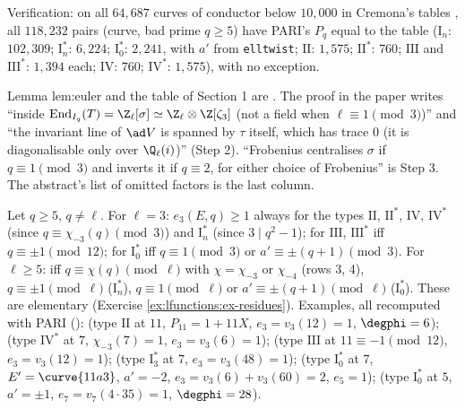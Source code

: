 Verification: on all $64{,}687$ curves of conductor below $10{,}000$ in Cremona's tables \cite{ecdata}, all $118{,}232$ pairs (curve, bad prime $q\ge5$) have PARI's $P_q$
equal to the table ($\mathrm I_n$: $102{,}309$; $\mathrm I_n^*$: $6{,}224$; $\mathrm I_0^*$: $2{,}241$, with $a'$ from \texttt{elltwist}; $\mathrm{II}$: $1{,}575$; $\mathrm{II}^*$: $760$; $\mathrm{III}$ and
$\mathrm{III}^*$: $1{,}394$ each; $\mathrm{IV}$: $760$; $\mathrm{IV}^*$: $1{,}575$), with no exception.

\begin{paperlink}
Lemma lem:euler and the table of Section 1 are . The proof in the paper writes ``inside $\operatorname{End}_{I_q}(T)=\Z_\ell[\sigma]\simeq\Z_\ell\otimes\Z[\zeta_3]$ (not a field
when $\ell\equiv1\pmod3$)'' and ``the invariant line of $\ad V$ is spanned by $\tau$ itself, which has trace $0$ (it is diagonalisable only over $\Q_\ell(i)$)'' (Step 2). ``Frobenius centralises $\sigma$ if $q\equiv1\pmod3$ and inverts it if
$q\equiv2$, for either choice of Frobenius'' is Step 3. The abstract's list of omitted factors is the last column.
\end{paperlink}

\begin{remark}\label{rem:lfunctions:euler-values}
Let $q\ge5$, $q\ne\ell$. For $\ell=3$: $e_3(E,q)\ge1$ always for the types $\mathrm{II}$, $\mathrm{II}^*$, $\mathrm{IV}$, $\mathrm{IV}^*$ (since $q\equiv\chi_{-3}(q)\pmod3$) and $\mathrm I_n^*$ (since
$3\mid q^2-1$); for $\mathrm{III}$, $\mathrm{III}^*$ iff $q\equiv\pm1\pmod{12}$; for $\mathrm I_0^*$ iff $q\equiv1\pmod3$ or $a'\equiv\pm(q+1)\pmod3$. For $\ell\ge5$: iff $q\equiv\chi(q)\pmod\ell$ with
$\chi=\chi_{-3}$ or $\chi_{-4}$ (rows 3, 4), $q\equiv\pm1\pmod\ell$ ($\mathrm I_n^*$), $q\equiv1\pmod\ell$ or $a'\equiv\pm(q+1)\pmod\ell$ ($\mathrm I_0^*$). These are elementary (Exercise
\ref{ex:lfunctions:ex-residues}). Examples, all recomputed with PARI ():  (type $\mathrm{II}$ at $11$, $P_{11}=1+11X$, $e_3=v_3(12)=1$,
$\degphi=6$);  (type $\mathrm{IV}^*$ at $7$, $\chi_{-3}(7)=1$, $e_3=v_3(6)=1$);  (type $\mathrm{III}$ at $11\equiv-1\pmod{12}$, $e_3=v_3(12)=1$);  (type $\mathrm I_3^*$
at $7$, $e_3=v_3(48)=1$);  (type $\mathrm I_0^*$ at $7$, $E'=\curve{11a3}$, $a'=-2$, $e_3=v_3(6)+v_3(60)=2$, $e_5=1$);  (type $\mathrm I_0^*$ at $5$, $a'=\pm1$,
$e_7=v_7(4\cdot35)=1$, $\degphi=28$).
\end{remark}


